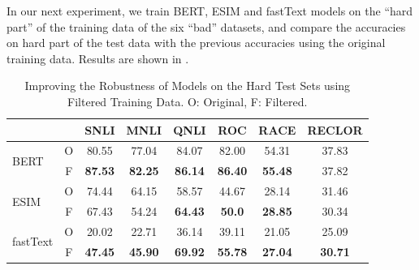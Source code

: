 In our next experiment, we train BERT, ESIM and fastText models
on the ``hard part'' of the training data of the six ``bad'' datasets, 
and compare the accuracies on hard part of the test data with 
the previous accuracies using the original training data. 
Results are shown in . 


\begin{table}[th]
\scriptsize
\centering
\begin{tabular}{p{5mm}ccccccc}
&    & SNLI & MNLI & QNLI & ROC & RACE & RECLOR \\ \hline
\multirow{2}{*}{BERT} &O& 80.55& 77.04 & 84.07 & 82.00 & 54.31& 37.83 \\ 
                      &F& \textbf{87.53} & \textbf{82.25} & \textbf{86.14} & \textbf{86.40} &\textbf{55.48} & 37.82 \\ \hline
\multirow{2}{*}{ESIM} &O& 74.44 & 64.15 & 58.57  & 44.67 &28.14 & 31.46 \\ 
		&F& 67.43 & 54.24 & \textbf{64.43} & \textbf{50.0} & \textbf{28.85} &30.34   \\ \hline
\multirow{2}{*}{fastText} &O& 20.02 & 22.71& 36.14 & 39.11 & 21.05& 25.09\\
                          &F & \textbf{47.45}&  \textbf{45.90} & \textbf{69.92}& \textbf{55.78} & \textbf{27.04} & \textbf{30.71} \\ \hline
\end{tabular}
\caption{\label{tab:filtered} Improving the Robustness of Models on the Hard Test Sets using
Filtered Training Data. O: Original, F: Filtered.}
\end{table}

